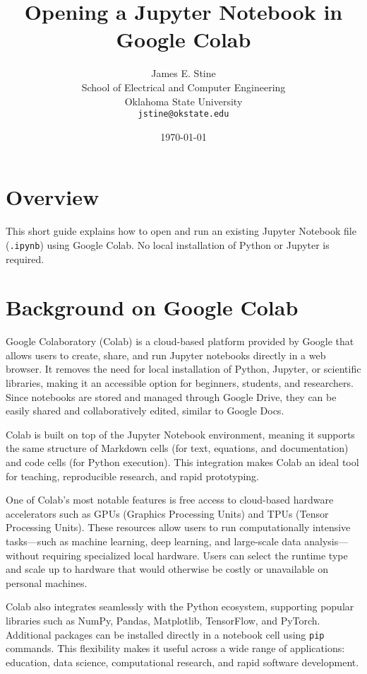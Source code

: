 \documentclass[11pt]{article}
\title{Opening a Jupyter Notebook in Google Colab}
\author{
  James E. Stine \\
  School of Electrical and Computer Engineering \\
  Oklahoma State University \\
  \texttt{jstine@okstate.edu}
}
\date{\today}
\begin{document}
\maketitle

\section*{Overview}
This short guide explains how to open and run an existing Jupyter
Notebook file (\texttt{.ipynb}) using Google Colab. No local
installation of Python or Jupyter is required.

\section{Background on Google Colab}

Google Colaboratory (Colab) is a cloud-based platform provided by
Google that allows users to create, share, and run Jupyter notebooks
directly in a web browser. It removes the need for local installation
of Python, Jupyter, or scientific libraries, making it an accessible
option for beginners, students, and researchers. Since notebooks are
stored and managed through Google Drive, they can be easily shared and
collaboratively edited, similar to Google Docs.

Colab is built on top of the Jupyter Notebook environment, meaning it
supports the same structure of Markdown cells (for text, equations,
and documentation) and code cells (for Python execution). This
integration makes Colab an ideal tool for teaching, reproducible
research, and rapid prototyping.

One of Colab’s most notable features is free access to cloud-based
hardware accelerators such as GPUs (Graphics Processing Units) and
TPUs (Tensor Processing Units). These resources allow users to run
computationally intensive tasks---such as machine learning, deep
learning, and large-scale data analysis---without requiring
specialized local hardware. Users can select the runtime type and
scale up to hardware that would otherwise be costly or unavailable on
personal machines.

Colab also integrates seamlessly with the Python ecosystem, supporting
popular libraries such as NumPy, Pandas, Matplotlib, TensorFlow, and
PyTorch. Additional packages can be installed directly in a notebook
cell using \texttt{pip} commands. This flexibility makes it useful
across a wide range of applications: education, data science,
computational research, and rapid software development.
\end{document}
